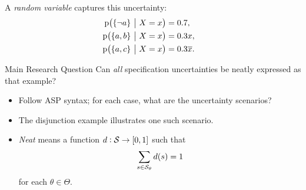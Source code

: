 \documentclass{beamer}
\newcommand{\at}[1]{\ensuremath{\!\del{#1}}}
\newcommand{\co}[1]{\ensuremath{\overline{#1}}}
\newcommand{\fml}[1]{\ensuremath{{\cal #1}}}
\newcommand{\pr}[1]{\ensuremath{\mathrm{p}\at{#1}}}
\newcommand{\given}{\ensuremath{~\middle|~}}
\begin{document}
\begin{frame}%
    A \textit{random variable} captures this uncertainty:
    $$
    \begin{aligned}
        \pr{\set{\neg a} \given X = x } &= 0.7, \cr
        \pr{\set{a, b} \given X = x } &= 0.3 x, \cr
        \pr{\set{a, c} \given X = x } &= 0.3 \co{x}.
    \end{aligned}
    $$
    \begin{block}{Main Research Question}
        Can \textit{all} specification uncertainties be neatly expressed as that example?
    \end{block}
    \begin{itemize}
        \item Follow ASP syntax; for each case, what are the uncertainty scenarios? 
        \item The disjunction example illustrates one such scenario.
        \item \textit{Neat} means a function $d: \fml{S} \to \intcc{0, 1}$ such that
        $$
        \sum_{s\in\fml{S}_\theta} d\at{s} = 1
        $$
        for each $\theta \in \Theta$.
    \end{itemize}    
\end{frame}
\end{document}
